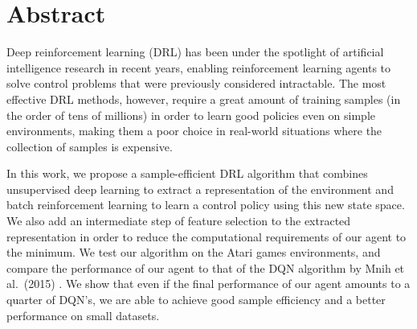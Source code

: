 \newpage
\chapter*{Abstract}


\vspace{0.5cm}

Deep reinforcement learning (DRL) has been under the spotlight of artificial 
intelligence research in recent years, enabling reinforcement learning agents 
to solve control problems that were previously considered intractable. 
The most effective DRL methods, however, require a great amount of training 
samples (in the order of tens of millions) in order to learn good policies
even on simple environments, making them a poor choice in real-world situations
where the collection of samples is expensive.

In this work, we propose a sample-efficient DRL algorithm that combines 
unsupervised deep learning to extract a representation of the environment and 
batch reinforcement learning to learn a control policy using this new state 
space.
We also add an intermediate step of feature selection to the extracted 
representation in order to reduce the computational requirements of our agent to 
the minimum.
We test our algorithm on the Atari games environments, and compare the 
performance of our agent to that of the DQN algorithm by Mnih et al.\ (2015) 
\cite{mnih2015human}.
We show that even if the final performance of our agent amounts to a quarter of 
DQN's, we are able to achieve good sample efficiency and a better performance on
small datasets.